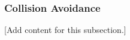 
\subsubsection{Collision Avoidance}
\label{subsubsec:design_2_5_4_collision_avoidance}

[Add content for this subsection.]
